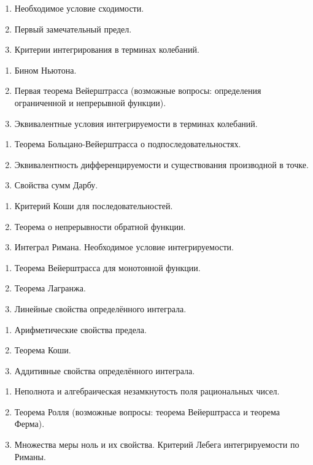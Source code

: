 \documentclass{article}
\newcounter{ticket}[subsection]
\newenvironment{ticket}[1][]{\item[Билет \ifthenelse{\equal{#1}{}}{}{\setcounter{ticket}{#1}}\theticket\refstepcounter{ticket}:]\phantom{}\begin{enumerate}}{\end{enumerate}}
\begin{document}
\begin{description}
	\begin{ticket}
		\item Необходимое условие сходимости.
		\item Первый замечательный предел.
		\item Критерии интегрирования в терминах колебаний.
	\end{ticket}
	\begin{ticket}
		\item Бином Ньютона.
		\item Первая теорема Вейерштрасса (возможные вопросы: определения ограниченной и непрерывной функции).
		\item Эквивалентные условия интегрируемости в терминах колебаний.
	\end{ticket}
	\begin{ticket}
		\item Теорема Больцано-Вейерштрасса о подпоследовательностях.
		\item Эквивалентность дифференцируемости и существования производной в точке.
		\item Свойства сумм Дарбу.
	\end{ticket}
	\begin{ticket}
		\item Критерий Коши для последовательностей.
		\item Теорема о непрерывности обратной функции.
		\item Интеграл Римана. Необходимое условие интегрируемости.
	\end{ticket}
	\begin{ticket}
		\item Теорема Вейерштрасса для монотонной функции.
		\item Теорема Лагранжа.
		\item Линейные свойства определённого интеграла.
	\end{ticket}
	\begin{ticket}
		\item Арифметические свойства предела.
		\item Теорема Коши.
		\item Аддитивные свойства определённого интеграла.
	\end{ticket}
	\begin{ticket}
		\item Неполнота и алгебраическая незамкнутость поля рациональных чисел.
		\item Теорема Ролля (возможные вопросы: теорема Вейерштрасса и теорема Ферма).
		\item Множества меры ноль и их свойства. Критерий Лебега интегрируемости по Риманы.

\end{ticket}
\end{description}
\end{document}
